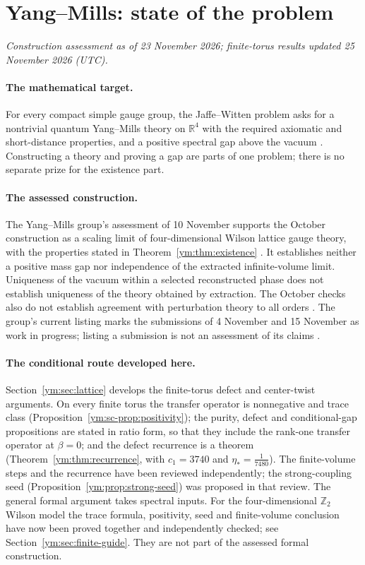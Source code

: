 \clearpage
{}
\section*{Yang--Mills: state of the problem}
\label{ym:sec:status}
\textit{Construction assessment as of 23 November 2026; finite-torus results updated 25 November 2026 (UTC).}

\paragraph{The mathematical target.}
For every compact simple gauge group, the Jaffe--Witten problem asks for a
nontrivial quantum Yang--Mills theory on $\mathbb R^4$ with the required
axiomatic and short-distance properties, and a positive spectral gap above
the vacuum \cite{JaffeWitten2006}. Constructing a theory and proving a gap
are parts of one problem; there is no separate prize for the existence part.

\paragraph{The assessed construction.}
The Yang--Mills group's assessment of 10 November supports the October
construction as a scaling limit of four-dimensional Wilson lattice gauge
theory, with the properties stated in Theorem~\ref{ym:thm:existence}
\cite{OpenAIYM2026,YMGroup2026}. It establishes neither a positive mass gap
nor independence of the extracted infinite-volume limit. Uniqueness of the
vacuum within a selected reconstructed phase does not establish uniqueness
of the theory obtained by extraction. The October checks also do not
establish agreement with perturbation theory to all orders
\cite{YMCheckScope2026}. The group's current listing marks the submissions
of 4 November and 15 November as work in progress; listing a submission is
not an assessment of its claims \cite{YMGroupCurrent2026}.

\paragraph{The conditional route developed here.}
Section~\ref{ym:sec:lattice} develops the finite-torus defect and center-twist
arguments. On every finite torus the transfer operator is nonnegative and
trace class (Proposition~\ref{ym:sc-prop:positivity}); the purity, defect and
conditional-gap propositions are stated in ratio form, so that they include
the rank-one transfer operator at $\beta=0$; and the defect recurrence is
a theorem (Theorem~\ref{ym:thm:recurrence}, with $c_1=3740$ and
$\eta_*=\frac1{7480}$). The finite-volume steps and the recurrence have been reviewed
independently; the strong-coupling seed (Proposition~\ref{ym:prop:strong-seed})
was proposed in that review. The general formal argument takes spectral inputs. For the
four-dimensional $\mathbb Z_2$ Wilson model the trace formula, positivity,
seed and finite-volume conclusion have now been proved together and
independently checked; see Section~\ref{ym:sec:finite-guide}. They are not part of the assessed formal construction.

